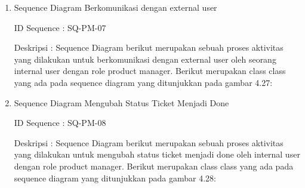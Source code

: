 \documentclass[12pt]{article}
\begin{document}
\begin{enumerate}[label=\textbf{4.\arabic*.}]
\begin{enumerate} [label=\textbf{4.2.\arabic*.}, wide, labelwidth=!, labelindent=0pt]
\begin{enumerate}[label=\textbf{4.2.2.\arabic*.}, wide, labelwidth=!, labelindent=0pt]
\begin{enumerate}[label=\arabic*.]
            
                
                \item Sequence Diagram Berkomunikasi dengan external user
                
                \noindent ID Sequence	: SQ-PM-07
                
                \noindent Deskripsi	: Sequence Diagram berikut merupakan sebuah proses aktivitas yang dilakukan untuk berkomunikasi dengan external user oleh seorang internal user dengan role product manager. Berikut merupakan class class yang ada pada sequence diagram yang ditunjukkan pada gambar 4.27:
                


                \item Sequence Diagram Mengubah Status Ticket Menjadi Done
                
                \noindent ID Sequence	: SQ-PM-08
                
                \noindent Deskripsi	: Sequence Diagram berikut merupakan sebuah proses aktivitas yang dilakukan untuk mengubah status ticket menjadi done oleh internal user dengan role product manager. Berikut merupakan class class yang ada pada sequence diagram yang ditunjukkan pada gambar 4.28:
                
            

\end{enumerate}
\end{enumerate}
\end{enumerate}
\end{enumerate}
\end{document}
